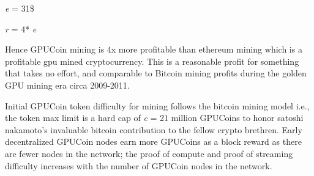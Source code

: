 \emph{e} = 31\$

\emph{r} = 4* \emph{e}  


Hence GPUCoin mining is 4x more profitable than ethereum mining which is a profitable gpu mined cryptocurrency. This is a reasonable profit for something that takes no effort, and comparable to Bitcoin mining profits during the golden GPU mining era circa 2009-2011.

Initial GPUCoin token difficulty for mining follows the bitcoin mining model i.e., the token max limit is a hard cap of \emph{c} = 21 million GPUCoins to honor satoshi nakamoto’s invaluable bitcoin contribution to the fellow crypto brethren. Early decentralized GPUCoin nodes earn more GPUCoins as a block reward as there are fewer nodes in the network; the proof of compute and proof of streaming difficulty increases with the number of GPUCoin nodes in the network.
